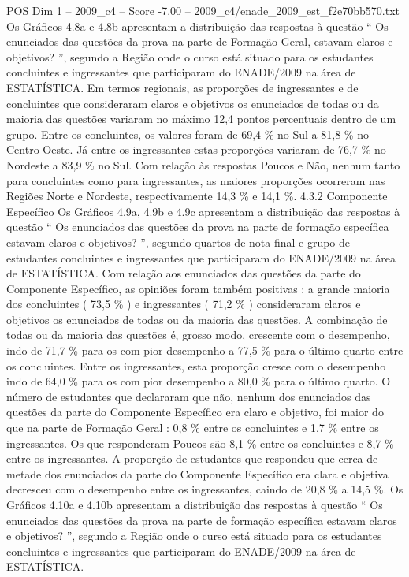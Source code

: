 \begin{textsample}{POS Dim 1 – 2009\_c4 – Score -7.00 – 2009\_c4/enade\_2009\_est\_f2e70bb570.txt}
Os Gráficos 4.8a e 4.8b apresentam a distribuição das respostas à questão “ Os enunciados das questões da prova na parte de Formação Geral, estavam claros e objetivos? ”, segundo a Região onde o curso está situado para os estudantes concluintes e ingressantes que participaram do ENADE/2009 na área de ESTATÍSTICA.
Em termos regionais, as proporções de ingressantes e de concluintes que consideraram claros e objetivos os enunciados de todas ou da maioria das questões variaram no máximo 12,4 pontos percentuais dentro de um grupo.
Entre os concluintes, os valores foram de 69,4 \% no Sul a 81,8 \% no Centro-Oeste.
Já entre os ingressantes estas proporções variaram de 76,7 \% no Nordeste a 83,9 \% no Sul.
Com relação às respostas Poucos e Não, nenhum tanto para concluintes como para ingressantes, as maiores proporções ocorreram nas Regiões Norte e Nordeste, respectivamente 14,3 \% e 14,1 \%. 4.3.2 Componente Específico Os Gráficos 4.9a, 4.9b e 4.9c apresentam a distribuição das respostas à questão “ Os enunciados das questões da prova na parte de formação específica estavam claros e objetivos? ”, segundo quartos de nota final e grupo de estudantes concluintes e ingressantes que participaram do ENADE/2009 na área de ESTATÍSTICA.
Com relação aos enunciados das questões da parte do Componente Específico, as opiniões foram também positivas : a grande maioria dos concluintes ( 73,5 \% ) e ingressantes ( 71,2 \% ) consideraram claros e objetivos os enunciados de todas ou da maioria das questões.
A combinação de todas ou da maioria das questões é, grosso modo, crescente com o desempenho, indo de 71,7 \% para os com pior desempenho a 77,5 \% para o último quarto entre os concluintes.
Entre os ingressantes, esta proporção cresce com o desempenho indo de 64,0 \% para os com pior desempenho a 80,0 \% para o último quarto.
O número de estudantes que declararam que não, nenhum dos enunciados das questões da parte do Componente Específico era claro e objetivo, foi maior do que na parte de Formação Geral : 0,8 \% entre os concluintes e 1,7 \% entre os ingressantes.
Os que responderam Poucos são 8,1 \% entre os concluintes e 8,7 \% entre os ingressantes.
A proporção de estudantes que respondeu que cerca de metade dos enunciados da parte do Componente Específico era clara e objetiva decresceu com o desempenho entre os ingressantes, caindo de 20,8 \% a 14,5 \%.
Os Gráficos 4.10a e 4.10b apresentam a distribuição das respostas à questão “ Os enunciados das questões da prova na parte de formação específica estavam claros e objetivos? ”, segundo a Região onde o curso está situado para os estudantes concluintes e ingressantes que participaram do ENADE/2009 na área de ESTATÍSTICA.

\end{textsample}
